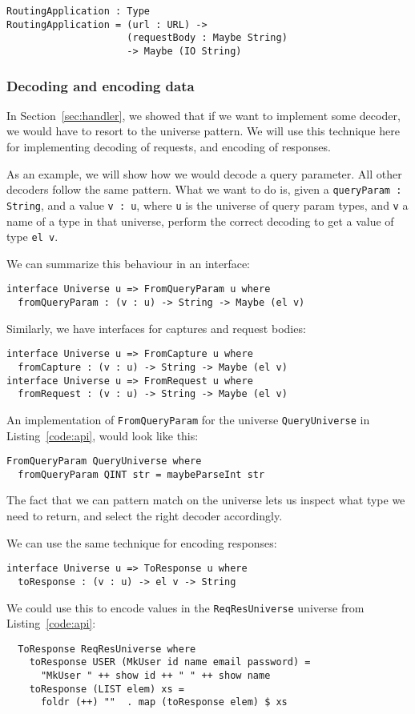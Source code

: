 \documentclass[12pt,a4paper]{article}
\begin{document}
\begin{verbatim}
RoutingApplication : Type
RoutingApplication = (url : URL) ->
                     (requestBody : Maybe String)
                     -> Maybe (IO String)
\end{verbatim}

\subsubsection{Decoding and encoding data}
In Section~\ref{sec:handler}, we showed that if we want to implement some decoder, we would have to resort to the universe pattern. We will use this technique here for implementing decoding of requests, and encoding of responses. 

As an example, we will show how we would decode a query parameter. All other decoders follow the same pattern.
What we want to do is, given a \texttt{queryParam : String}, and a value \texttt{v : u},
where \texttt{u} is the universe of query param types, and  \texttt{v} a name of a type in that universe,
perform the correct decoding to get a value of type \texttt{el v}.

We can summarize this behaviour in an interface:
\begin{verbatim}
interface Universe u => FromQueryParam u where
  fromQueryParam : (v : u) -> String -> Maybe (el v)
\end{verbatim}
Similarly, we have interfaces for captures and request bodies:
\begin{verbatim}
interface Universe u => FromCapture u where
  fromCapture : (v : u) -> String -> Maybe (el v)
interface Universe u => FromRequest u where
  fromRequest : (v : u) -> String -> Maybe (el v)
\end{verbatim}
An implementation of \texttt{FromQueryParam} for the universe \texttt{QueryUniverse} in Listing~\ref{code:api}, would look like this:
\begin{verbatim}
FromQueryParam QueryUniverse where
  fromQueryParam QINT str = maybeParseInt str
\end{verbatim}
The fact that we can pattern match on the universe lets us inspect what type we need to return, and select the right decoder accordingly.


We can use the same technique for encoding responses:
\begin{verbatim}
interface Universe u => ToResponse u where
  toResponse : (v : u) -> el v -> String
\end{verbatim}
We could use this to encode values in the \texttt{ReqResUniverse} universe from
Listing~\ref{code:api}:
\begin{verbatim}
  ToResponse ReqResUniverse where
    toResponse USER (MkUser id name email password) =
      "MkUser " ++ show id ++ " " ++ show name
    toResponse (LIST elem) xs =
      foldr (++) ""  . map (toResponse elem) $ xs
\end{verbatim}
\end{document}
